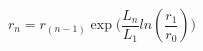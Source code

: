 \begin{equation}
   \label{eq:Axial}
   \displaystyle r_n= \displaystyle  r_{(n-1)} \displaystyle \exp\big( \displaystyle  \frac{L_n}{L_{1}}ln(\displaystyle \frac{r_1}{r_0})\big)
\end{equation}



%





%



